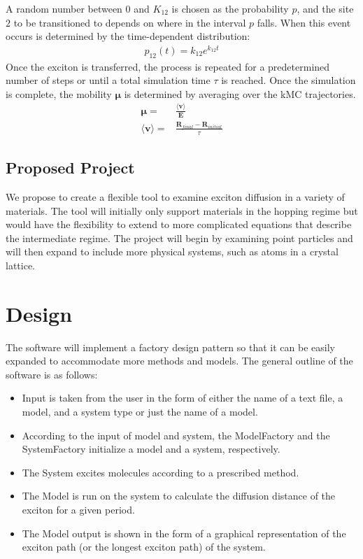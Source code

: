 \documentclass{article}
\begin{document}
A random number between $0$ and $K_{12}$ is chosen as the probability $p$, and the site $2$ to be transitioned to depends on where in the interval $p$ falls. When this event occurs is determined by the time-dependent distribution:
\begin{align}
    p_{12}(t)=k_{12}e^{k_{12}t}
\end{align}
Once the exciton is transferred, the process is repeated for a predetermined number of steps or until a total simulation time $\tau$ is reached. 
Once the simulation is complete, the mobility $\mathbf{\mu}$ is determined by averaging over the kMC trajectories.
\begin{align}
    \mathbf{\mu}=&\frac{\langle \mathbf{v}\rangle}{\mathbf{E}}\\
    \langle\mathbf{v}\rangle=&\frac{\mathbf{R}_{final}-\mathbf{R}_{initial}}{\tau}
\end{align}


\subsection{Proposed Project}

We propose to create a flexible tool to examine exciton diffusion in a variety of materials. The tool will initially only support materials in the hopping regime but would have the flexibility to extend to more complicated equations that describe the intermediate regime. The project will begin by examining point particles and will then expand to include more physical systems, such as atoms in a crystal lattice.

\section{Design}

The software will implement a factory design pattern so that it can be easily expanded to accommodate more methods and models. The general outline of the software is as follows:

\begin{itemize}
    \item Input is taken from the user in the form of either the name of a text file, a model, and a system type or just the name of a model.
    \item According to the input of model and system, the ModelFactory and the SystemFactory initialize a model and a system, respectively.
    \item The System excites molecules according to a prescribed method.
    \item The Model is run on the system to calculate the diffusion distance of the exciton for a given period.
    \item The Model output is shown in the form of a graphical representation of the exciton path (or the longest exciton path) of the system.
\end{itemize}
\end{document}
